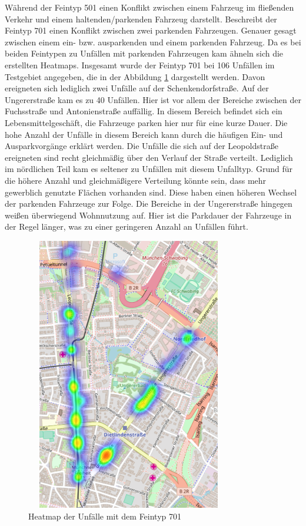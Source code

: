 Während der Feintyp 501 einen Konflikt zwischen einem Fahrzeug im fließenden Verkehr und einem haltenden/parkenden Fahrzeug darstellt. Beschreibt der Feintyp 701 einen Konflikt zwischen zwei parkenden Fahrzeugen. Genauer gesagt zwischen einem ein- bzw. ausparkenden und einem parkenden Fahrzeug. Da es bei beiden Feintypen zu Unfällen mit parkenden Fahrzeugen kam ähneln sich die erstellten Heatmaps. Insgesamt wurde der Feintyp 701 bei 106 Unfällen im Testgebiet angegeben, die in der Abbildung \ref{fig:Heatmap_701} dargestellt werden. Davon ereigneten sich lediglich zwei Unfälle auf der Schenkendorfstraße. Auf der Ungererstraße kam es zu 40 Unfällen. Hier ist vor allem der Bereiche zwischen der Fuchsstraße und Antonienstraße auffällig. In diesem Bereich befindet sich ein Lebensmittelgeschäft, die Fahrzeuge parken hier nur für eine kurze Dauer. Die hohe Anzahl der Unfälle in diesem Bereich kann durch die häufigen Ein- und Ausparkvorgänge erklärt werden. Die Unfälle die sich auf der Leopoldstraße ereigneten sind recht gleichmäßig über den Verlauf der Straße verteilt. Lediglich im nördlichen Teil kam es seltener zu Unfällen mit diesem Unfalltyp. Grund für die höhere Anzahl und gleichmäßigere Verteilung könnte sein, dass mehr gewerblich genutzte Flächen vorhanden sind. Diese haben einen höheren Wechsel der parkenden Fahrzeuge zur Folge. Die Bereiche in der Ungererstraße hingegen weißen überwiegend Wohnnutzung auf. Hier ist die Parkdauer der Fahrzeuge in der Regel länger, was zu einer geringeren Anzahl an Unfällen führt. 

\begin{savenotes}
	\begin{figure}[H]
		\centering
		\includegraphics[width=9cm,height=12cm]{figures/HM_701}
		\caption[Heatmap der Unfälle mit dem Feintyp 701]{Heatmap der Unfälle mit dem Feintyp 701}\label{fig:Heatmap_701}
	\end{figure}
\end{savenotes}

